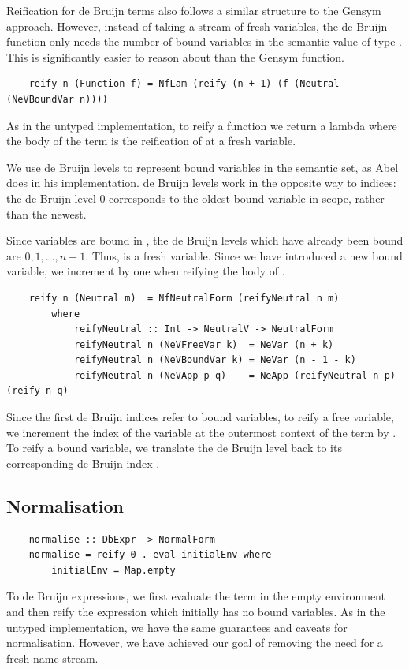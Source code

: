 Reification for de Bruijn terms also follows a similar structure to the Gensym approach. However, instead of taking a stream of fresh variables, the de Bruijn  function only needs the number of bound variables in the semantic value of type . This is significantly easier to reason about than the Gensym  function.

\begin{lstlisting}
    reify n (Function f) = NfLam (reify (n + 1) (f (Neutral (NeVBoundVar n))))
\end{lstlisting}

As in the untyped implementation, to reify a function  we return a lambda where the body of the term is the reification of  at a fresh variable.

We use de Bruijn levels to represent bound variables in the semantic set, as Abel does in his implementation. de Bruijn levels work in the opposite way to indices: the de Bruijn level 0 corresponds to the oldest bound variable in scope, rather than the newest. 

Since  variables are bound in , the de Bruijn levels which have already been bound are $0, 1, \dots, n - 1$. Thus,  is a fresh variable. Since we have introduced a new bound variable, we increment  by one when reifying the body of .

\begin{lstlisting}
    reify n (Neutral m)  = NfNeutralForm (reifyNeutral n m)
        where
            reifyNeutral :: Int -> NeutralV -> NeutralForm
            reifyNeutral n (NeVFreeVar k)  = NeVar (n + k)
            reifyNeutral n (NeVBoundVar k) = NeVar (n - 1 - k)
            reifyNeutral n (NeVApp p q)    = NeApp (reifyNeutral n p) (reify n q)
\end{lstlisting}

Since the first  de Bruijn indices refer to bound variables, to reify a free variable, we increment the index of the variable at the outermost context of the term  by .
To reify a bound variable, we translate the de Bruijn level  back to its corresponding de Bruijn index .


\subsection{Normalisation}

\begin{lstlisting}
    normalise :: DbExpr -> NormalForm
    normalise = reify 0 . eval initialEnv where
        initialEnv = Map.empty  
\end{lstlisting}

To  de Bruijn expressions, we first evaluate the term in the empty environment and then reify the expression which initially has no bound variables. As in the untyped implementation, we have the same guarantees and caveats for normalisation. However, we have achieved our goal of removing the need for a fresh name stream.